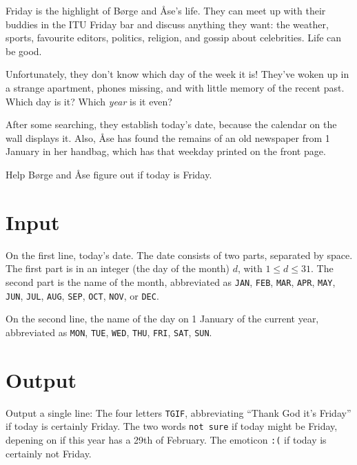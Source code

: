 

Friday is the highlight of Børge and Åse’s life.
They can meet up with their buddies in the ITU Friday bar and discuss anything they want: the weather, sports, favourite editors, politics, religion, and gossip about celebrities.
Life can be good.

Unfortunately, they don’t know which day of the week it is!
They’ve woken up in a strange apartment, phones missing, and with little memory of the recent past.
Which day is it? Which \emph{year} is it even?

After some searching, they establish today’s date, because the calendar on the wall displays it.
Also, Åse has found the remains of an old newspaper from 1 January in her handbag, which has that weekday printed on the front page.

Help Børge and Åse figure out if today is Friday.

\section*{Input}

On the first line, today’s date.
The date consists of two parts, separated by space.
The first part is in an integer (the day of the month) $d$, with $1\leq d\leq 31$.
The second part is the name of the month, abbreviated as \texttt{JAN}, \texttt{FEB}, \texttt{MAR}, \texttt{APR},
\texttt{MAY}, \texttt{JUN}, \texttt{JUL}, \texttt{AUG}, \texttt{SEP}, \texttt{OCT}, \texttt{NOV}, or \texttt{DEC}.

On the second line, the name of the day on 1 January of the current year, abbreviated as \texttt{MON}, \texttt{TUE}, \texttt{WED}, \texttt{THU}, \texttt{FRI}, \texttt{SAT}, \texttt{SUN}.


\section*{Output}

Output a single line:
The four letters \texttt{TGIF}, abbreviating ``Thank God it's Friday'' if today is certainly Friday.
The two words \texttt{not sure} if today might be Friday, depening on if this year has a 29th of February.
The emoticon \texttt{:(} if today is certainly not Friday.
